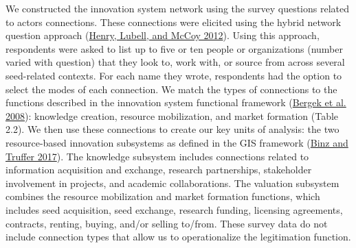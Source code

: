 \documentclass[twoside,12pt,final]{ucthesis-CA2012}
\begin{document}
\begin{ucmainmatter}
We constructed the innovation system network using the survey questions
related to actors\textquotesingle{} connections. These connections were elicited using
the \textquotesingle hybrid\textquotesingle{} network question approach
(\protect\hyperlink{ref-Henry_Lubell_McCoy_2012}{Henry, Lubell, and McCoy 2012}).
Using this approach, respondents were asked to list up to five or ten
people or organizations (number varied with question) that they look to,
work with, or source from across several seed-related contexts. For each
name they wrote, respondents had the option to select the modes of each
connection. We match the types of connections to the functions described
in the innovation system functional framework
(\protect\hyperlink{ref-Bergek_Jacobsson_Carlsson_Lindmark_Rickne_2008}{Bergek et al. 2008}):
knowledge creation, resource mobilization, and market formation (Table
2.2). We then use these connections to create our key units of analysis:
the two resource-based innovation subsystems as defined in the GIS
framework
(\protect\hyperlink{ref-Binz_Truffer_2017}{Binz and Truffer 2017}). The
knowledge subsystem includes connections related to information
acquisition and exchange, research partnerships, stakeholder involvement
in projects, and academic collaborations. The valuation subsystem
combines the resource mobilization and market formation functions, which
includes seed acquisition, seed exchange, research funding, licensing
agreements, contracts, renting, buying, and/or selling to/from. These
survey data do not include connection types that allow us to
operationalize the legitimation function.
\begin{table}


\end{table}
\end{ucmainmatter}
\end{document}
